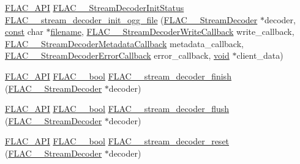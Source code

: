 \begin{DoxyCompactItemize}
\hyperlink{group__flac__export_ga56ca07df8a23310707732b1c0007d6f5}{F\+L\+A\+C\+\_\+\+A\+PI} \hyperlink{group__flac__stream__decoder_gaaed54a24ac6310d29c5cafba79759c44}{F\+L\+A\+C\+\_\+\+\_\+\+Stream\+Decoder\+Init\+Status} \hyperlink{group__flac__stream__decoder_ga609f2a43987d6abeaef654575462030c}{F\+L\+A\+C\+\_\+\+\_\+stream\+\_\+decoder\+\_\+init\+\_\+ogg\+\_\+file} (\hyperlink{struct_f_l_a_c_____stream_decoder}{F\+L\+A\+C\+\_\+\+\_\+\+Stream\+Decoder} $\ast$decoder, \hyperlink{getopt1_8c_a2c212835823e3c54a8ab6d95c652660e}{const} char $\ast$\hyperlink{test__portburn_8cpp_a7efa5e9c7494c7d4586359300221aa5d}{filename}, \hyperlink{group__flac__stream__decoder_ga61e48dc2c0d2f6c5519290ff046874a4}{F\+L\+A\+C\+\_\+\+\_\+\+Stream\+Decoder\+Write\+Callback} write\+\_\+callback, \hyperlink{group__flac__stream__decoder_ga6aa87c01744c1c601b7f371f627b6e14}{F\+L\+A\+C\+\_\+\+\_\+\+Stream\+Decoder\+Metadata\+Callback} metadata\+\_\+callback, \hyperlink{group__flac__stream__decoder_gac896ee6a12668e9015fab4fbc6aae996}{F\+L\+A\+C\+\_\+\+\_\+\+Stream\+Decoder\+Error\+Callback} error\+\_\+callback, \hyperlink{sound_8c_ae35f5844602719cf66324f4de2a658b3}{void} $\ast$client\+\_\+data)
\item 
\hyperlink{group__flac__export_ga56ca07df8a23310707732b1c0007d6f5}{F\+L\+A\+C\+\_\+\+A\+PI} \hyperlink{ordinals_8h_a95103469f1cbd78b8cf250194985b34e}{F\+L\+A\+C\+\_\+\+\_\+bool} \hyperlink{group__flac__stream__decoder_gaa51bb38f762ee11b320a0839f165c5ce}{F\+L\+A\+C\+\_\+\+\_\+stream\+\_\+decoder\+\_\+finish} (\hyperlink{struct_f_l_a_c_____stream_decoder}{F\+L\+A\+C\+\_\+\+\_\+\+Stream\+Decoder} $\ast$decoder)
\item 
\hyperlink{group__flac__export_ga56ca07df8a23310707732b1c0007d6f5}{F\+L\+A\+C\+\_\+\+A\+PI} \hyperlink{ordinals_8h_a95103469f1cbd78b8cf250194985b34e}{F\+L\+A\+C\+\_\+\+\_\+bool} \hyperlink{group__flac__stream__decoder_ga0109ce87f2c648b224b68c08b3c090cb}{F\+L\+A\+C\+\_\+\+\_\+stream\+\_\+decoder\+\_\+flush} (\hyperlink{struct_f_l_a_c_____stream_decoder}{F\+L\+A\+C\+\_\+\+\_\+\+Stream\+Decoder} $\ast$decoder)
\item 
\hyperlink{group__flac__export_ga56ca07df8a23310707732b1c0007d6f5}{F\+L\+A\+C\+\_\+\+A\+PI} \hyperlink{ordinals_8h_a95103469f1cbd78b8cf250194985b34e}{F\+L\+A\+C\+\_\+\+\_\+bool} \hyperlink{group__flac__stream__decoder_ga2342cf4f3caf9ad20fca1373aaea0c27}{F\+L\+A\+C\+\_\+\+\_\+stream\+\_\+decoder\+\_\+reset} (\hyperlink{struct_f_l_a_c_____stream_decoder}{F\+L\+A\+C\+\_\+\+\_\+\+Stream\+Decoder} $\ast$decoder)
\item 

\end{DoxyCompactItemize}
